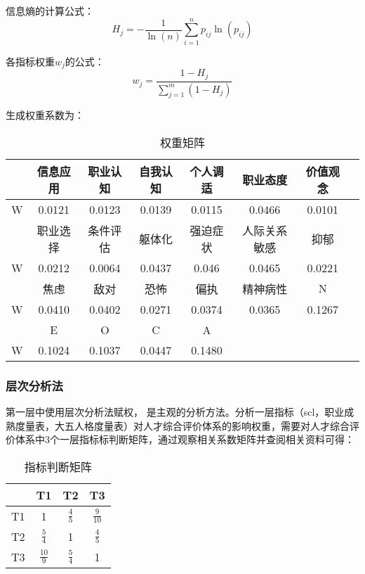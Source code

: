 \documentclass[withoutpreface,bwprint]{cumcmthesis} %
\begin{document}
信息熵的计算公式：
\begin{equation}
    H_j = -\frac{1}{\ln(n)} \sum_{i=1}^{n} p_{ij} \ln(p_{ij})
\end{equation}
    
各指标权重$w_j$的公式：
\begin{equation}
    w_j = \frac{1 - H_j}{\sum_{j=1}^{m} (1 - H_j)}
\end{equation}


  
生成权重系数为：

\begin{table}[h]
    \centering
    \begin{tabular}{cccccccc}
        \toprule
        & 信息应用 & 职业认知 & 自我认知 & 个人调适 & 职业态度 & 价值观念 \\ \midrule
        W & 0.0121 & 0.0123 & 0.0139 & 0.0115 & 0.0466 & 0.0101 \\ \midrule
        & 职业选择 & 条件评估 & 躯体化 & 强迫症状 & 人际关系敏感 & 抑郁 \\ \midrule
        W & 0.0212 & 0.0064 & 0.0437 & 0.046 & 0.0465 & 0.0221 \\ \midrule
        & 焦虑 & 敌对 & 恐怖 & 偏执 & 精神病性 & N \\ \midrule
        W & 0.0410 & 0.0402 & 0.0271 & 0.0374 & 0.0365 & 0.1267 \\ \midrule
        & E  & O & C & A \\ \midrule
        W & 0.1024 & 0.1037 & 0.0447 & 0.1480 \\ \bottomrule
    \end{tabular}
    \caption{权重矩阵}
    \label{tab:weights}
\end{table}

\subsubsection{层次分析法}

第一层中使用层次分析法赋权， 是主观的分析方法。分析一层指标（scl，职业成熟度量表，大五人格度量表）对人才综合评价体系的影响权重，需要对人才综合评价体系中3个一层指标标判断矩阵，通过观察相关系数矩阵并查阅相关资料\cite{AHP1}\cite{AHP2}\cite{AHP3}可得：

\begin{table}[h]
    \centering
    \begin{tabular}{cccc}
        \toprule
        & T1 & T2 & T3 \\ \midrule
        T1 & 1 & \(\frac{4}{5}\) & \(\frac{9}{10}\) \\
        T2 & \(\frac{5}{4}\) & 1 & \(\frac{4}{5}\) \\
        T3 & \(\frac{10}{9}\) & \(\frac{5}{4}\) & 1 \\ \bottomrule
    \end{tabular}
    \caption{指标判断矩阵}
    \label{tab:index judgment matrix}
    \end{table}
        
\end{document}
